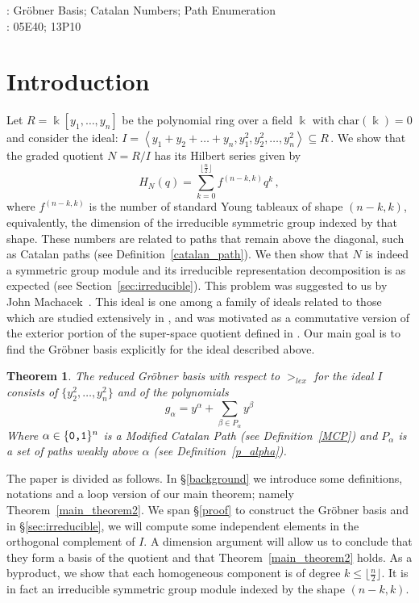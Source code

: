 \documentclass[10pt,a4paper]{article}
\newtheorem{theorem}{Theorem}[section]
\def\field{\Bbbk}
\DeclareMathOperator{\la}{\langle}
\DeclareMathOperator{\ra}{\rangle}
\begin{document}
\bigskip

: Gr\"obner Basis; Catalan Numbers; Path Enumeration\\

: 05E40; 13P10

\section{Introduction} 
Let $R = \field[y_1, \dots, y_n]$ be the polynomial ring over a field $\field$ with $\text{char}( \field) = 0$ and consider the ideal:
$I = \la y_1 + y_2 + \dots + y_n, y^2_1, y^2_2, \dots , y^2_n \ra \subseteq R\,.$
We show that the graded quotient $N = R /I$ has its Hilbert series given by 
$$H_N(q)=\sum_{k=0}^{\lfloor \frac{n}{2} \rfloor } f^{(n-k,k)}q^k\,,$$
 where $f^{(n-k,k)}$ is the number of standard Young tableaux of shape $(n-k,k)$, equivalently, the dimension of the irreducible symmetric group indexed by that shape. 
 These numbers are related to paths that remain above the diagonal, such as Catalan paths (see Definition~\ref{catalan_path}).
 We then show that $N$ is indeed a symmetric group module and
its irreducible representation decomposition is as expected (see Section~\ref{sec:irreducible}). This problem was suggested to us by John Machacek~\cite{M}.
This ideal is one among a family of ideals related to those which are studied extensively in \cite{HRS}, and was motivated as a commutative version of the exterior portion of the super-space quotient defined in \cite{Z}. Our main goal is to find the Gr\"obner basis explicitly for the ideal described above.  
\begin{theorem} \label{main_theorem}
	 The reduced Gr\"obner basis with respect to $>_{lex}$ for the ideal $I$ consists of $\{y_2^2, \dots, y_n^2\}$ and of the polynomials
	\begin{equation} \label{main_theorem_eqn}
		g_{\alpha} = y^{\alpha} + \sum_{\beta \in P_{\alpha}} y^{\beta}
	\end{equation}
	Where $\alpha \in \{\textnormal{\texttt{0,1}}\}^n$ is a Modified Catalan Path (see Definition~\ref{MCP}) and $P_\alpha$ is a set of paths weakly above $\alpha$ (see Definition~\ref{p_alpha}). \end{theorem}
The   paper is divided as follows. In \S\ref{background}  we introduce some definitions, notations and a loop version of our main theorem; namely Theorem~\ref{main_theorem2}. 
We span \S\ref{proof} to construct the Gr\"obner basis and in \S\ref{sec:irreducible}, we will compute some independent elements in the orthogonal complement of $I$. A dimension argument will allow us to conclude that they form a basis of the quotient and that Theorem~\ref{main_theorem2} holds. As a byproduct, we show that each homogeneous component is of degree $k\le {\lfloor \frac{n}{2} \rfloor }$. It is in fact  an irreducible  symmetric group module indexed by the shape $(n-k,k)$.
\end{document}
